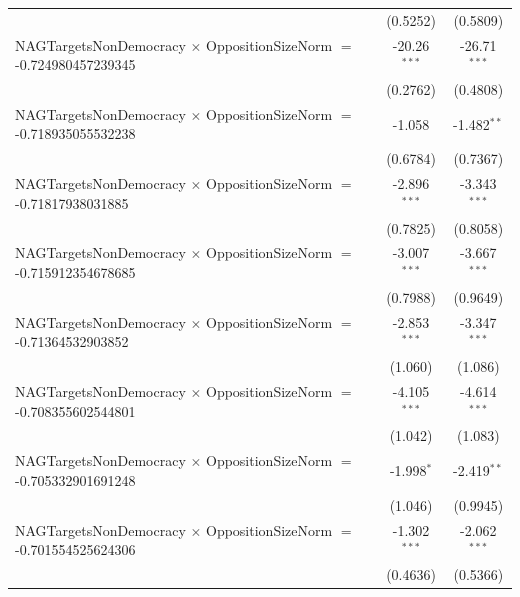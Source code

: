 \begin{tabular}{lcc}
                                                                                & (0.5252)             & (0.5809)\\   
   NAGTargetsNonDemocracy $\times$ OppositionSizeNorm $=$ -0.724980457239345    & -20.26$^{***}$       & -26.71$^{***}$\\   
                                                                                & (0.2762)             & (0.4808)\\   
   NAGTargetsNonDemocracy $\times$ OppositionSizeNorm $=$ -0.718935055532238    & -1.058               & -1.482$^{**}$\\   
                                                                                & (0.6784)             & (0.7367)\\   
   NAGTargetsNonDemocracy $\times$ OppositionSizeNorm $=$ -0.71817938031885     & -2.896$^{***}$       & -3.343$^{***}$\\   
                                                                                & (0.7825)             & (0.8058)\\   
   NAGTargetsNonDemocracy $\times$ OppositionSizeNorm $=$ -0.715912354678685    & -3.007$^{***}$       & -3.667$^{***}$\\   
                                                                                & (0.7988)             & (0.9649)\\   
   NAGTargetsNonDemocracy $\times$ OppositionSizeNorm $=$ -0.71364532903852     & -2.853$^{***}$       & -3.347$^{***}$\\   
                                                                                & (1.060)              & (1.086)\\   
   NAGTargetsNonDemocracy $\times$ OppositionSizeNorm $=$ -0.708355602544801    & -4.105$^{***}$       & -4.614$^{***}$\\   
                                                                                & (1.042)              & (1.083)\\   
   NAGTargetsNonDemocracy $\times$ OppositionSizeNorm $=$ -0.705332901691248    & -1.998$^{*}$         & -2.419$^{**}$\\   
                                                                                & (1.046)              & (0.9945)\\   
   NAGTargetsNonDemocracy $\times$ OppositionSizeNorm $=$ -0.701554525624306    & -1.302$^{***}$       & -2.062$^{***}$\\   
                                                                                & (0.4636)             & (0.5366)\\   

\end{tabular}
